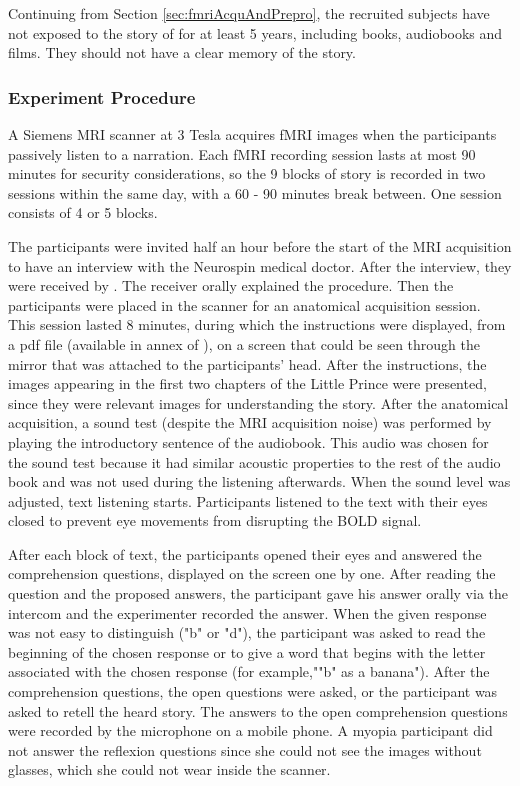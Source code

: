 Continuing from Section \ref{sec:fmriAcquAndPrepro}, the recruited subjects have not exposed to the story of  for at least 5 years, including books, audiobooks and films. They should not have a clear memory of the story. 
\subsubsection{Experiment Procedure}
A Siemens MRI scanner at 3 Tesla acquires fMRI images when the participants passively listen to a narration. Each fMRI recording session lasts at most 90 minutes for security considerations, so the 9 blocks of story is recorded in two sessions within the same day, with a 60 - 90 minutes break between. One session consists of 4 or 5 blocks. 

The participants were invited half an hour before the start of the MRI acquisition to have an interview with the Neurospin medical doctor. After the interview, they were received by \citeauthor{todorovicAnalysesIRMfLors2018}. The receiver orally explained the procedure. Then the participants were placed in the scanner for an anatomical acquisition session. This session lasted 8 minutes, during which the instructions were displayed, from a pdf file (available in annex of \textcite{todorovicAnalysesIRMfLors2018}), on a screen that could be seen through the mirror that was attached to the participants' head. After the instructions, the images appearing in the first two chapters of the Little Prince were presented, since they were relevant images for understanding the story. After the anatomical acquisition, a sound test (despite the MRI acquisition noise) was performed by playing the introductory sentence of the audiobook. This audio was chosen for the sound test because it had similar acoustic properties to the rest of the audio book and was not used during the listening afterwards. When the sound level was adjusted, text listening starts. Participants listened to the text with their eyes closed to prevent eye movements from disrupting the BOLD signal.

After each block of text, the participants opened their eyes and answered the comprehension questions, displayed on the screen one by one. After reading the question and the proposed answers, the participant gave his answer orally via the intercom and the experimenter recorded the answer. When the given response was not easy to distinguish ("b" or "d"), the participant was asked to read the beginning of the chosen response or to give a word that begins with the letter associated with the chosen response (for example,""b" as a banana"). After the comprehension questions, the open questions were asked, or the participant was asked to retell the heard story. The answers to the open comprehension questions were recorded by the microphone on a mobile phone. A myopia participant did not answer the reflexion questions since she could not see the images without glasses, which she could not wear inside the scanner. 

